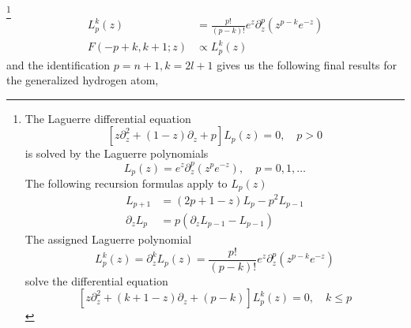 \footnote{The Laguerre differential equation
\begin{equation}
    \left[z \partial_{z}^{2}+(1-z) \partial_{z}+p\right] L_{p}(z)=0, \quad p>0
    \end{equation}
is solved by the Laguerre polynomials
\begin{equation}
    L_{p}(z)=e^{z} \partial_{z}^{p}\left(z^{p} e^{-z}\right), \quad p=0,1, \ldots
    \end{equation}
The following recursion formulas apply to $L_p (z)$
\begin{equation}
\begin{aligned} L_{p+1} &=(2 p+1-z) L_{p}-p^{2} L_{p-1} \\ \partial_{z} L_{p} &=p\left(\partial_{z} L_{p-1}-L_{p-1}\right) \end{aligned}
\end{equation}
The assigned Laguerre polynomial
\begin{equation}
    L_{p}^{k}(z)=\partial_{z}^{k} L_{p}(z)=\frac{p !}{(p-k) !} e^{z} \partial_{z}^{p}\left(z^{p-k} e^{-z}\right)
    \end{equation}
solve the differential equation
\begin{equation}
    \left[z \partial_{z}^{2}+(k+1-z) \partial_{z}+(p-k)\right] L_{p}^{k}(z)=0, \quad k \leq p
    \end{equation}}
\begin{align}
L_{p}^{k}(z)&=\frac{p !}{(p-k) !} e^{z} \partial_{z}^{p}\left(z^{p-k} e^{-z}\right)\\
F(-p+k, k+1 ; z) &\propto L_{p}^{k}(z)
\end{align}
and the identification $p = n + 1, k = 2l + 1$ gives us the following final results for the generalized hydrogen atom,

